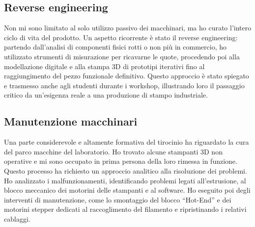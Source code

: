%
\subsection{Reverse engineering}
Non mi sono limitato al solo utilizzo passivo dei macchinari, ma ho curato l'intero ciclo di vita del prodotto. Un aspetto ricorrente è stato il reverse engineering: partendo dall'analisi di componenti fisici rotti o non più in commercio, ho utilizzato strumenti di misurazione per ricavarne le quote, procedendo poi alla modellazione digitale e alla stampa 3D di prototipi iterativi fino al raggiungimento del pezzo funzionale definitivo. Questo approccio è stato spiegato e trasmesso anche agli studenti durante i workshop, illustrando loro il passaggio critico da un'esigenza reale a una produzione di stampo industriale.

%
\subsection{Manutenzione macchinari}
Una parte considerevole e altamente formativa del tirocinio ha riguardato la cura del parco macchine del laboratorio. Ho trovato alcune stampanti 3D non operative e mi sono occupato in prima persona della loro rimessa in funzione. Questo processo ha richiesto un approccio analitico alla risoluzione dei problemi.
Ho analizzato i malfunzionamenti, identificando problemi legati all'estrusione, al blocco meccanico dei motorini delle stampanti e al software.
Ho eseguito poi degli interventi di manutenzione, come lo smontaggio del blocco ``Hot-End'' e dei motorini stepper dedicati al raccoglimento del filamento e ripristinando i relativi cablaggi.